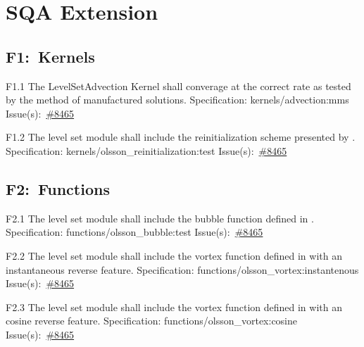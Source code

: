 
\chapter{\label{sqa-extension}SQA Extension}\section*{F1:~Kernels}
\begin{Requirement}{F1.1}
The LevelSetAdvection Kernel shall converage at the correct rate as tested by the method of manufactured solutions.
\newline
Specification: kernels/advection:mms
\newline
Issue(s):~\href{https://github.com/idaholab/moose/issues/8465}{\#8465}
\end{Requirement}

\begin{Requirement}{F1.2}
The level set module shall include the reinitialization scheme presented by \cite{olsson2005conservative}.
\newline
Specification: kernels/olsson\_reinitialization:test
\newline
Issue(s):~\href{https://github.com/idaholab/moose/issues/8465}{\#8465}
\end{Requirement}
\section*{F2:~Functions}
\begin{Requirement}{F2.1}
The level set module shall include the bubble function defined in \cite{olsson2005conservative}.
\newline
Specification: functions/olsson\_bubble:test
\newline
Issue(s):~\href{https://github.com/idaholab/moose/issues/8465}{\#8465}
\end{Requirement}

\begin{Requirement}{F2.2}
The level set module shall include the vortex function defined in \cite{olsson2005conservative} with an instantaneous reverse feature.
\newline
Specification: functions/olsson\_vortex:instantenous
\newline
Issue(s):~\href{https://github.com/idaholab/moose/issues/8465}{\#8465}
\end{Requirement}

\begin{Requirement}{F2.3}
The level set module shall include the vortex function defined in \cite{olsson2005conservative} with an cosine reverse feature.
\newline
Specification: functions/olsson\_vortex:cosine
\newline
Issue(s):~\href{https://github.com/idaholab/moose/issues/8465}{\#8465}
\end{Requirement}
